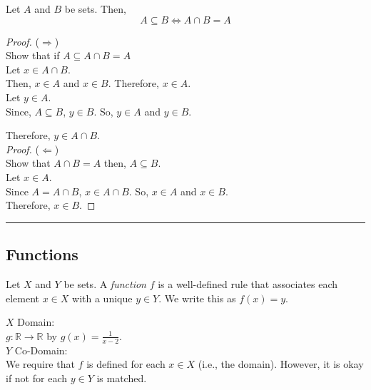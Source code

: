 \documentclass{article}
\def \proofDistance {5pt}
\newcommand{\proofseparator}{\par\noindent\rule{\textwidth}{0.4pt}}
\newcommand{\R}{\ensuremath{\mathbb{R}}}
\newcommand{\pf}[1]{
    \vspace{\proofDistance}
    \begin{proof}
    #1
    \end{proof}
    \proofseparator
}
\begin{document}
        \begin{theorem}
            Let $A$ and $B$ be sets. Then, $$A\subseteq B \iff A\cap B = A$$
        \end{theorem}

        \pf{
        ($\Rightarrow$) \\
        Show that if $A\subseteq A\cap B = A$ \\
        
        \noindent Let $x\in A\cap B$. \\
        \indent Then, $x\in A$ and $x\in B$.
        \indent Therefore, $x\in A$. \\

        \noindent Let $y\in A$. \\
        \indent Since, $A\subseteq B$, $y\in B$. So, $y\in A$ and $y\in B$.

        \indent Therefore, $y\in A\cap B$. \\

        \noindent \textit{Proof.} ($\Leftarrow$) \\
        Show that $A\cap B = A$ then, $A\subseteq B$. \\

        \noindent Let $x\in A$. \\ 
        \indent Since $A = A\cap B$, $x\in A\cap B$. So, $x\in A$ and $x\in B$. \\
        \indent Therefore, $x\in B$.
        } 

\newpage


    \subsection{Functions}

    \begin{definition}
        Let $X$ and $Y$ be sets. A \textit{function} $f$ is a well-defined rule that associates each element $x\in X$ with a unique $y\in Y$. We write this as $f(x)=y$.
    \end{definition}

    \vspace{5pt}

        $X$ Domain: \\
        $g\colon \R \rightarrow \R$ by $g(x) = \frac{1}{x-2}$. \\

        $Y$ Co-Domain: \\
        We require that $f$ is defined for each $x\in X$ (i.e., the domain). However, it is okay if not for each $y\in Y$ is matched. \\
\end{document}
